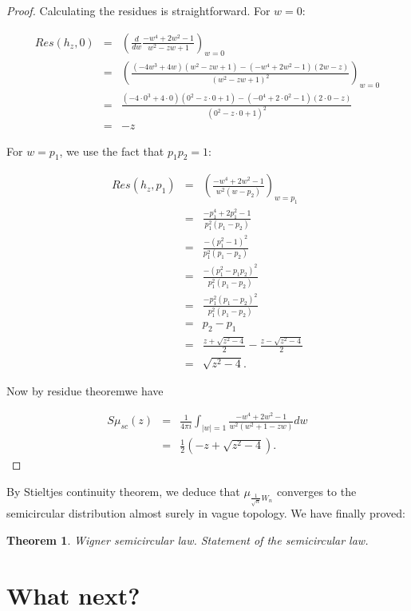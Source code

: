 \documentclass[12pt,a4paper,leqno]{report}
\theoremstyle{plain}
\newtheorem{theo}[equation]{Theorem}
\theoremstyle{definition}
\theoremstyle{remark}
\begin{document}
\begin{proof}
Calculating the residues is straightforward. For $w=0$:

\begin{eqnarray*}
Res(h_z,0) & = &
\left(\frac{d}{dw} \frac{-w^4+2w^2-1}{w^2-zw+1} \right)_{w=0}\\
& = & \left(\frac{(-4w^3+4w)(w^2-zw+1)-(-w^4+2w^2-1)(2w-z)}{(w^2-zw+1)^2} \right)_{w=0}\\
& = & \frac{(-4\cdot 0^3+4 \cdot 0)(0^2-z\cdot 0+1)-(-0^4+2\cdot 0^2-1)(2\cdot 0-z)}{(0^2-z\cdot 0+1)^2} \\
& = & -z
\end{eqnarray*}

For $w=p_1$, we use the fact that $p_1p_2 = 1$:

\begin{eqnarray*}
Res(h_z,p_1) & = &
\left(\frac{-w^4+2w^2-1}{w^2(w-p_2)} \right)_{w=p_1}\\
& = & \frac{-p_1^4+2p_1^2-1}{p_1^2(p_1-p_2)}\\
& = & \frac{-(p_1^2-1)^2}{p_1^2(p_1-p_2)}\\
& = & \frac{-(p_1^2-p_1p_2)^2}{p_1^2(p_1-p_2)}\\
& = & \frac{-p_1^2(p_1-p_2)^2}{p_1^2(p_1-p_2)}\\
& = & p_2-p_1\\
& = & \frac{z + \sqrt{z^2-4}}{2} - \frac{z - \sqrt{z^2-4}}{2}\\
& = & \sqrt{z^2-4}.
\end{eqnarray*}

Now by residue theoremwe have

\begin{eqnarray*}
S\mu_{sc}(z) & = & \frac{1}{4\pi i} \int_{|w|=1} \frac{-w^4+2w^2-1}{w^2(w^2+1 -zw)} dw\\
& = & \frac{1}{2} ( -z + \sqrt{z^2-4}).
\end{eqnarray*}

\end{proof}

By Stieltjes continuity theorem, we deduce that $\mu_{\frac{1}{\sqrt{n}}W_n}$ converges to the semicircular distribution almost surely in vague topology. We have finally proved:

\begin{theo}
\emph{Wigner semicircular law.} Statement of the semicircular law.
\end{theo}


\chapter{What next?}\label{future}
\end{document}
